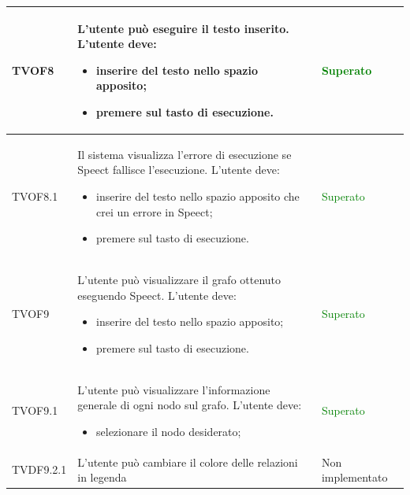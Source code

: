 \documentclass[openany,12pt,a4paper]{report}
\begin{document}
\begin{longtable}[c]{| p{2.5cm} |p{8cm} | p{2.5cm} |}
	\hline
	\newline TVOF8&
	\newline L'utente può eseguire il testo inserito. L'utente deve:
	\begin{itemize}
		\item inserire del testo nello spazio apposito;
		\item premere sul tasto di esecuzione.
	\end{itemize}&
	\newline \textcolor{green}{Superato}
	\\[1em]
	\hline
	\newline TVOF8.1&
	\newline Il sistema visualizza l'errore di esecuzione se Speect fallisce l'esecuzione. L'utente deve:
	\begin{itemize}
		\item inserire del testo nello spazio apposito che crei un errore in Speect;
		\item premere sul tasto di esecuzione.
	\end{itemize}&
	\newline \textcolor{green}{Superato}
	\\[1em]
	\hline
	
	\newline TVOF9&
	\newline L'utente può visualizzare il grafo ottenuto eseguendo Speect. L'utente deve:
	\begin{itemize}
		\item inserire del testo nello spazio apposito;
		\item premere sul tasto di esecuzione.
	\end{itemize}&
	\newline \textcolor{green}{Superato}
	\\[1em]
	\hline
	
	
	\newline TVOF9.1&
	\newline L'utente può visualizzare l'informazione generale di ogni nodo sul grafo. L'utente deve:
	\begin{itemize}
		\item selezionare il nodo desiderato;
	\end{itemize}&
	\newline \textcolor{green}{Superato}
	\\[1em]
	\hline
	
	\newline TVDF9.2.1&
	\newline L'utente può cambiare il colore delle relazioni in legenda&
	\newline  Non implementato
	\\[1em]
	\hline
	

\end{longtable}
\end{document}
